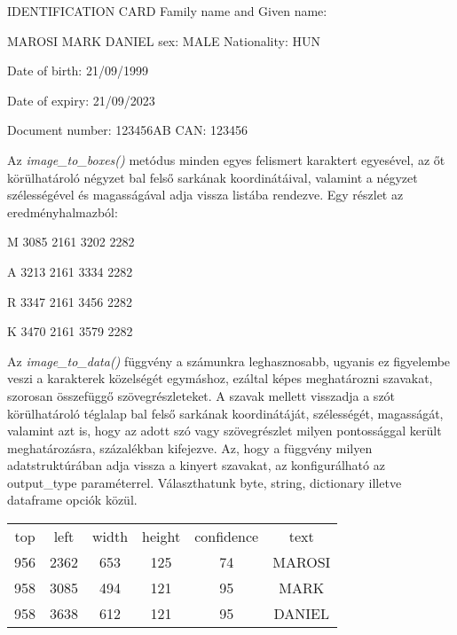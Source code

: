 \documentclass[12pt]{report}
\begin{document}
\begin{tcolorbox}
    IDENTIFICATION CARD
    \newline
    Family name and Given name:

    MAROSI MARK DANIEL
    \newline
    sex: MALE Nationality: HUN

    Date of birth: 21/09/1999

    Date of expiry: 21/09/2023

    Document number: 123456AB
    \newline
    CAN: 123456
\end{tcolorbox}

Az \emph{image\_to\_boxes()} metódus minden egyes felismert karaktert egyesével, az őt körülhatároló négyzet bal felső sarkának koordinátáival, valamint a négyzet szélességével és magasságával adja vissza listába rendezve.
Egy részlet az eredményhalmazból:

\begin{tcolorbox}
M 3085 2161 3202 2282

A 3213 2161 3334 2282

R 3347 2161 3456 2282

K 3470 2161 3579 2282
\end{tcolorbox}

Az \emph{image\_to\_data()} függvény a számunkra leghasznosabb, ugyanis ez figyelembe veszi a karakterek közelségét egymáshoz, ezáltal képes meghatározni szavakat, szorosan összefüggő szövegrészleteket. A szavak mellett visszadja a szót körülhatároló téglalap bal felső sarkának koordinátáját, szélességét, magasságát, valamint azt is, hogy az adott szó vagy szövegrészlet milyen pontossággal került meghatározásra, százalékban kifejezve.
Az, hogy a függvény milyen adatstruktúrában adja vissza a kinyert szavakat, az konfigurálható az output\_type paraméterrel. Választhatunk byte, string, dictionary illetve dataframe opciók közül.

\begin{tcolorbox}
    \begin{center}
        \begin{tabular}{ c c c c c c }
         top & left & width & height & confidence & text \\ 
         956 & 2362 & 653 & 125 & 74 & MAROSI \\  
         958 & 3085 & 494 & 121 & 95 & MARK \\  
         958 & 3638 & 612 & 121 & 95 & DANIEL \\  
        \end{tabular}
    \end{center}
\end{tcolorbox}
\end{document}
